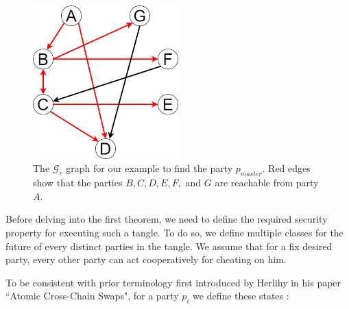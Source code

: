\begin{figure}
    \centering
    \includegraphics[width=0.5\textwidth]{figures/cooperable-example-tour.png}
    \caption{The $\mathcal{G}_{r}$ graph for our example to find the party $p_{master}$. Red edges show that the parties $B, C, D, E, F, $ and $G$ are reachable from party $A$.
}
    \label{fig:example-gr}
\end{figure}
Before delving into the first theorem, we need to define the required security property for executing such a tangle. To do so, we define multiple classes for the future of every distinct parties in the tangle. We assume that for a fix desired party, every other party can act cooperatively for cheating on him.


To be consistent with prior terminology first introduced by Herlihy in his paper ``Atomic Cross-Chain Swaps", for a party $p_i$ we define these states \cite{herlihy2018atomic}:

